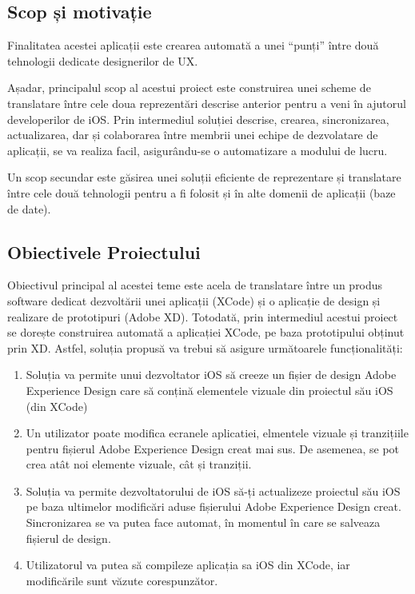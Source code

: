 \subsection{Scop și motivație}
\label{sub-sec:proj-scope}


Finalitatea acestei aplicații este crearea automată  a unei “punți” între două tehnologii dedicate designerilor de UX.

Așadar, principalul scop al acestui proiect este construirea unei scheme de translatare între cele doua reprezentări descrise anterior pentru a veni în ajutorul developerilor de iOS. Prin intermediul soluției descrise, crearea, sincronizarea, actualizarea, dar și colaborarea între membrii unei echipe de dezvolatare de aplicații, se va realiza facil, asigurându-se o automatizare a modului de lucru.

Un scop secundar este găsirea unei soluții eficiente de reprezentare și translatare între cele două tehnologii pentru a fi folosit și în alte domenii de aplicații (baze de date).


\subsection{Obiectivele Proiectului}
\label{sub-sec:proj-objectives}

Obiectivul principal al acestei teme este  acela de translatare între un produs software dedicat dezvoltării unei aplicații (XCode) și o aplicație de design și realizare de prototipuri (Adobe XD). Totodată, prin intermediul acestui proiect se dorește construirea automată a aplicației XCode, pe baza prototipului obținut prin XD.
Astfel, soluția propusă va trebui să asigure următoarele funcționalități:

\begin{enumerate}
\item Soluția va permite unui dezvoltator iOS să creeze un fișier de design Adobe Experience Design care să conțină elementele vizuale din proiectul său iOS (din XCode)
\item Un utilizator poate modifica ecranele aplicatiei, elmentele vizuale și tranzițiile pentru fișierul Adobe Experience Design creat mai sus. De asemenea, se pot crea atât noi elemente vizuale, cât și tranziții.
\item Soluția va permite dezvoltatorului de iOS să-ți actualizeze proiectul său iOS pe baza ultimelor modificări aduse fișierului Adobe Experience Design creat. Sincronizarea se va putea face automat, în momentul în care se salveaza fișierul de design. 
\item  Utilizatorul va putea să compileze aplicația sa iOS din XCode, iar modificările sunt văzute corespunzător. 
\end{enumerate}

